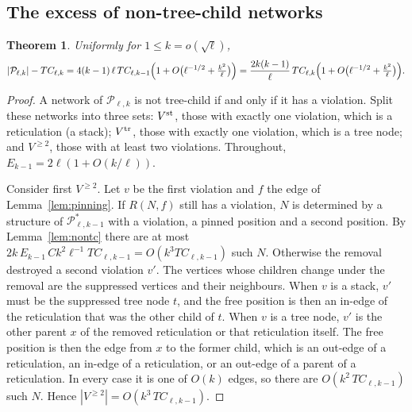 \documentclass[11pt,a4paper]{article}
\newtheorem{theorem}{Theorem}[section]
\theoremstyle{definition}
\newcommand{\cP}{\mathcal{P}}
\begin{document}
\subsection{The excess of non-tree-child networks}

\begin{theorem}\label{thm:gamma}
Uniformly for $1\le k=o(\sqrt\ell)$,
\begin{equation}\label{eq:gammaall}
|\cP_{\ell,k}|-TC_{\ell,k}=4(k-1)\,\ell\,TC_{\ell,k-1}\Bigl(1+O\bigl(\ell^{-1/2}+\tfrac{k^2}{\ell}\bigr)\Bigr)=\frac{2k(k-1)}{\ell}\,TC_{\ell,k}\Bigl(1+O\bigl(\ell^{-1/2}+\tfrac{k^2}{\ell}\bigr)\Bigr).
\end{equation}
\end{theorem}

\begin{proof}
A network of $\cP_{\ell,k}$ is not tree-child if and only if it has a violation. Split these networks into three sets: $V^{\rm st}$, those with exactly one violation, which is a reticulation (a stack); $V^{\rm tr}$, those with exactly one violation, which is a tree node; and $V^{\ge2}$, those with at least two violations. Throughout, $E_{k-1}=2\ell(1+O(k/\ell))$.

Consider first $V^{\ge2}$. Let $v$ be the first violation and $f$ the edge of Lemma~\ref{lem:pinning}. If $R(N,f)$ still has a violation, $N$ is determined by a structure of $\cP^*_{\ell,k-1}$ with a violation, a pinned position and a second position. By Lemma~\ref{lem:nontc} there are at most $2k\,E_{k-1}\,Ck^2\ell^{-1}TC_{\ell,k-1}=O(k^3TC_{\ell,k-1})$ such $N$. Otherwise the removal destroyed a second violation $v'$. The vertices whose children change under the removal are the suppressed vertices and their neighbours. When $v$ is a stack, $v'$ must be the suppressed tree node $t$, and the free position is then an in-edge of the reticulation that was the other child of $t$. When $v$ is a tree node, $v'$ is the other parent $x$ of the removed reticulation or that reticulation itself. The free position is then the edge from $x$ to the former child, which is an out-edge of a reticulation, an in-edge of a reticulation, or an out-edge of a parent of a reticulation. In every case it is one of $O(k)$ edges, so there are $O(k^2\,TC_{\ell,k-1})$ such $N$. Hence $|V^{\ge2}|=O(k^3\,TC_{\ell,k-1})$.


\end{proof}
\end{document}
